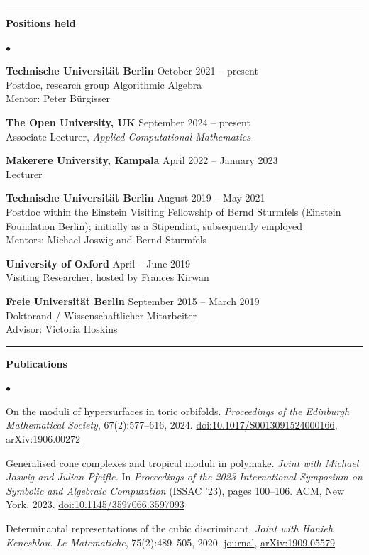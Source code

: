 \documentclass[10pt]{article}
\newcommand{\cvsection}[1]{%
  \par\vspace{0.24cm}%
  \noindent\rule{\textwidth}{0.4pt}%
  \par\vspace{0.12cm}%
  \noindent\textbf{\large #1}%
  \par\vspace{0.12cm}%
}
\newenvironment{cvlist}%
  {\begin{list}{$\bullet$}{%
     \setlength{\leftmargin}{1.1em}\setlength{\labelwidth}{0.8em}%
     \setlength{\itemsep}{0.12cm}\setlength{\parsep}{0pt}%
     \setlength{\topsep}{0pt}\setlength{\partopsep}{0pt}}}%
  {\end{list}}
\begin{document}
\cvsection{Positions held}
\begin{cvlist}
\item {\bf Technische Universit\"at Berlin} \quad October 2021 -- present\\
Postdoc, research group Algorithmic Algebra\\
Mentor: Peter B\"urgisser
\item {\bf The Open University, UK} \quad September 2024 -- present\\
Associate Lecturer, {\em Applied Computational Mathematics}
\item {\bf Makerere University, Kampala} \quad April 2022 -- January 2023\\
Lecturer
\item {\bf Technische Universit\"at Berlin} \quad August 2019 -- May 2021\\
Postdoc within the Einstein Visiting Fellowship of Bernd Sturmfels
(Einstein Foundation Berlin); initially as a Stipendiat, subsequently employed\\
Mentors: Michael Joswig and Bernd Sturmfels
\item {\bf University of Oxford} \quad April -- June 2019\\
Visiting Researcher, hosted by Frances Kirwan
\item {\bf Freie Universit\"at Berlin} \quad September 2015 -- March 2019\\
Doktorand / Wissenschaftlicher Mitarbeiter\\
Advisor: Victoria Hoskins
\end{cvlist}

\cvsection{Publications}
\enlargethispage{-2\baselineskip} %
\begin{cvlist}
\item On the moduli of hypersurfaces in toric orbifolds.
{\em Proceedings of the Edinburgh Mathematical Society}, 67(2):577--616, 2024.
\href{https://doi.org/10.1017/S0013091524000166}{doi:10.1017/S0013091524000166},
\href{https://arxiv.org/abs/1906.00272}{arXiv:1906.00272}
\item Generalised cone complexes and tropical moduli in polymake.
{\em Joint with Michael Joswig and Julian Pfeifle.}
In {\em Proceedings of the 2023 International Symposium on Symbolic and
Algebraic Computation} (ISSAC '23), pages 100--106. ACM, New York, 2023.
\href{https://dl.acm.org/doi/abs/10.1145/3597066.3597093}{doi:10.1145/3597066.3597093}
\item Determinantal representations of the cubic discriminant.
{\em Joint with Hanieh Keneshlou.}
{\em Le Matematiche}, 75(2):489--505, 2020.
\href{https://lematematiche.dmi.unict.it/index.php/lematematiche/article/view/1997}{journal},
\href{https://arxiv.org/abs/1909.05579}{arXiv:1909.05579}
\end{cvlist}
\end{document}
